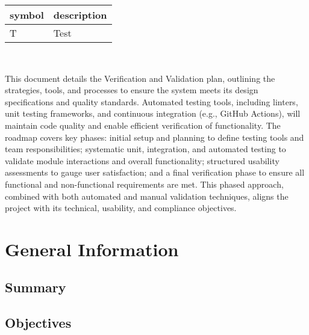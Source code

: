 \documentclass[12pt, titlepage]{article}
\begin{document}
\renewcommand{\arraystretch}{1.2}
\begin{tabular}{l l} 
  \toprule		
  \textbf{symbol} & \textbf{description}\\
  \midrule 
  T & Test\\
  \bottomrule
\end{tabular}\\



\newpage


This document details the Verification and Validation plan, outlining the strategies, 
tools, and processes to ensure the system meets its design specifications and quality standards. 
Automated testing tools, including linters, unit testing frameworks, and continuous integration 
(e.g., GitHub Actions), will maintain code quality and enable efficient verification of functionality. 
The roadmap covers key phases: initial setup and planning to define testing tools and team responsibilities; 
systematic unit, integration, and automated testing to validate module interactions and overall functionality; 
structured usability assessments to gauge user satisfaction; and a final verification phase to ensure all functional 
and non-functional requirements are met. This phased approach, combined with both automated and manual validation 
techniques, aligns the project with its technical, usability, and compliance objectives.

\section{General Information}

\subsection{Summary}


\subsection{Objectives}

\end{document}
